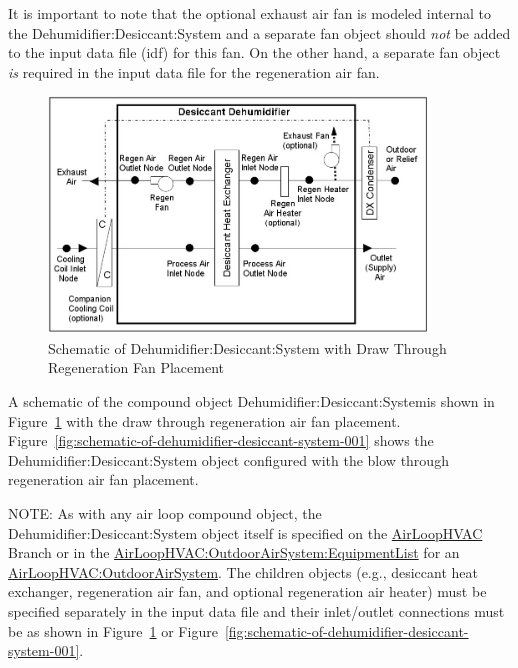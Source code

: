 It is important to note that the optional exhaust air fan is modeled internal to the Dehumidifier:Desiccant:System and a separate fan object should \emph{not} be added to the input data file (idf) for this fan. On the other hand, a separate fan object \emph{is} required in the input data file for the regeneration air fan.

\begin{figure}[hbtp] %
\centering
\includegraphics[width=0.9\textwidth, height=0.9\textheight, keepaspectratio=true]{media/image409.png}
\caption{Schematic of Dehumidifier:Desiccant:System with Draw Through Regeneration Fan Placement \protect \label{fig:schematic-of-dehumidifier-desiccant-system}}
\end{figure}

A schematic of the compound object Dehumidifier:Desiccant:Systemis shown in Figure~\ref{fig:schematic-of-dehumidifier-desiccant-system} with the draw through regeneration air fan placement. Figure~\ref{fig:schematic-of-dehumidifier-desiccant-system-001} shows the Dehumidifier:Desiccant:System object configured with the blow through regeneration air fan placement.

NOTE: As with any air loop compound object, the Dehumidifier:Desiccant:System object itself is specified on the \hyperref[airloophvac]{AirLoopHVAC} Branch or in the \hyperref[airloophvacoutdoorairsystemequipmentlist]{AirLoopHVAC:OutdoorAirSystem:EquipmentList} for an \hyperref[airloophvacoutdoorairsystem]{AirLoopHVAC:OutdoorAirSystem}. The children objects (e.g., desiccant heat exchanger, regeneration air fan, and optional regeneration air heater) must be specified separately in the input data file and their inlet/outlet connections must be as shown in Figure~\ref{fig:schematic-of-dehumidifier-desiccant-system} or Figure~\ref{fig:schematic-of-dehumidifier-desiccant-system-001}.


